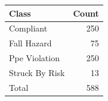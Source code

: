 \begin{tabular}{lr}
\toprule
Class & Count \\
\midrule
Compliant & 250 \\
Fall Hazard & 75 \\
Ppe Violation & 250 \\
Struck By Risk & 13 \\
\midrule
Total & 588 \\
\bottomrule
\end{tabular}
